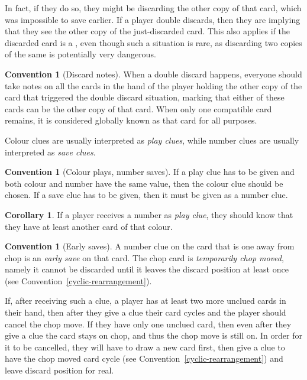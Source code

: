 \documentclass[a4paper]{article}
\theoremstyle{plain}
\theoremstyle{definition}
\newtheorem{corollary}[theorem]{Corollary}
\newtheorem{convention}[theorem]{Convention}
\begin{document}
In fact, if they do so, they might be discarding the other copy of that card, which was impossible to save earlier. If a player double discards, then they are implying that they see the other copy of the just-discarded card. This also applies if the discarded card is a , even though such a situation is rare, as discarding two copies of the same  is potentially very dangerous. %

\begin{convention}[Discard notes]
	\label{discard-notes}
	When a double discard happens, everyone should take notes on all the cards in the hand of the player holding the other copy of the card that triggered the double discard situation, marking that either of these cards can be the other copy of that card. When only one compatible card remains, it is considered globally known as that card for all purposes.
\end{convention}

Colour clues are usually interpreted as \emph{play clues}, while number clues are usually interpreted as \emph{save clues}.

\begin{convention}[Colour plays, number saves]
	If a play clue has to be given and both colour and number have the same value, then the colour clue should be chosen. If a save clue has to be given, then it must be given as a number clue.
\end{convention}

\begin{corollary}
	If a player receives a number as \emph{play clue}, they should know that they have at least another card of that colour.
\end{corollary}

\begin{convention}[Early saves]
	A number clue on the card that is one away from chop is an \emph{early save} on that card. The chop card is \emph{temporarily chop moved}, namely it cannot be discarded until it leaves the discard position at least once (see Convention~\ref{cyclic-rearrangement}).
\end{convention}

If, after receiving such a clue, a player has at least two more unclued cards in their hand, then after they give a clue their card cycles and the player should cancel the chop move. If they have only one unclued card, then even after they give a clue the card stays on chop, and thus the chop move is still on. In order for it to be cancelled, they will have to draw a new card first, then give a clue to have the chop moved card cycle (see Convention~\ref{cyclic-rearrangement}) and leave discard position for real.
\end{document}
